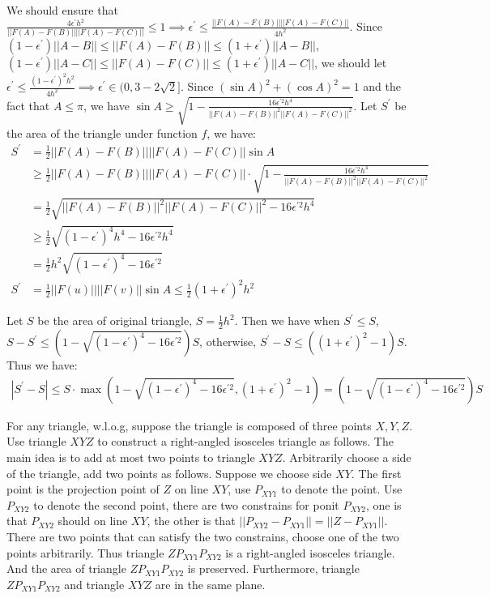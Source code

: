 We should ensure that $\frac{4\epsilon^{\prime}h^2}{||F(A)-F(B)||||F(A)-F(C)||}\le1 \implies \epsilon^{\prime} \le \frac{||F(A)-F(B)||||F(A)-F(C)||}{4h^2}$.
Since $(1-\epsilon^{\prime}) ||A-B||\le||F(A)-F(B)||\le (1+\epsilon^{\prime}) ||A-B||$, $(1-\epsilon^{\prime}) ||A-C||\le||F(A)-F(C)||\le (1+\epsilon^{\prime}) ||A-C||$,
we should let $ \epsilon^{\prime} \le \frac{(1-\epsilon^{\prime})^2h^2}{4h^2}\implies \epsilon^{\prime} \in (0,3-2\sqrt{2}]$.
Since $(\sin A)^2+(\cos A)^2=1$ and the fact that $A\le\pi$, we have $\sin A \ge \sqrt{1- \frac{16\epsilon^{\prime 2}h^4}{||F(A)-F(B)||^2||F(A)-F(C)||^2}}$.
Let $S^{\prime}$ be the area of the triangle under function $f$, we have:
\begin{align}
    \nonumber S^{\prime}&=\frac{1}{2}||F(A)-F(B)||||F(A)-F(C)||\sin A \\
    \nonumber &\ge \frac{1}{2}||F(A)-F(B)||||F(A)-F(C)||\cdot \sqrt{1- \frac{16\epsilon^{\prime 2}h^4}{||F(A)-F(B)||^2||F(A)-F(C)||^2}}\\
    \nonumber &=\frac{1}{2}\sqrt{||F(A)-F(B)||^2||F(A)-F(C)||^2-16\epsilon^{\prime 2}h^4}\\
    \nonumber &\ge \frac{1}{2}\sqrt{(1-\epsilon^{\prime})^4h^4-16\epsilon^{\prime 2}h^4}\\
    \nonumber &=\frac{1}{2}h^2\sqrt{(1-\epsilon^{\prime})^4-16\epsilon^{\prime 2}}\\
    \nonumber S^{\prime}&=\frac{1}{2}||F(u)||||F(v)||\sin A \le \frac{1}{2}(1+\epsilon^{\prime})^2h^2
\end{align}

Let $S$ be the area of original triangle, $S=\frac{1}{2}h^2$.
Then we have 
when $S^{\prime}\le S$, $S-S^{\prime}\le (1-\sqrt{(1-\epsilon^{\prime})^4-16\epsilon^{\prime 2}})S$,
otherwise, $S^{\prime}-S \le ((1+\epsilon^{\prime})^2-1)S$.
Thus we have:
\begin{align}
    \nonumber |S^{\prime}-S|\le S \cdot \max(1-\sqrt{(1-\epsilon^{\prime})^4-16\epsilon^{\prime 2}}, (1+\epsilon^{\prime})^2-1)=(1-\sqrt{(1-\epsilon^{\prime})^4-16\epsilon^{\prime 2}})S
\end{align}


For any triangle, w.l.o.g, suppose the triangle is composed of three points $X,Y,Z$.
Use triangle $XYZ$ to construct a right-angled isosceles triangle as follows. 
The main idea is to add at most two points to triangle $XYZ$.
Arbitrarily choose a side of the triangle, add two points as follows.
Suppose we choose side $XY$.
The first point is the projection point of $Z$ on line $XY$, use $P_{XY1}$ to denote the point.
Use $P_{XY2}$ to denote the second point, there are two constrains for ponit $P_{XY2}$,
one is that $P_{XY2}$ should on  line $XY$, the other is that $||P_{XY2}-P_{XY1}||=||Z-P_{XY1}||$.
There are two points that can satisfy the two constrains, choose one of the two points arbitrarily.
Thus triangle $ZP_{XY1}P_{XY2}$ is a right-angled isosceles triangle.
And the area of triangle $ZP_{XY1}P_{XY2}$ is preserved. 
Furthermore, triangle $ZP_{XY1}P_{XY2}$ and triangle $XYZ$ are in the same plane.


